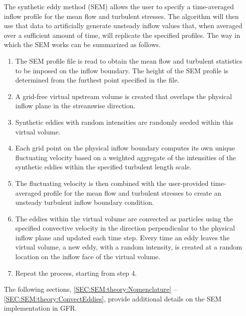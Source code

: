 The synthetic eddy method (SEM)\cite{Jarrin_2006} allows the user to specify a
time-averaged inflow profile for the mean flow and turbulent stresses.
%
The algorithm will then use that data to artificially generate unsteady inflow
values that, when averaged over a sufficient amount of time, will replicate
the specified profiles.
%
The way in which the SEM works can be summarized as follows.
%
\begin{enumerate}
\item
The SEM profile file is read to obtain the mean flow and turbulent statistics
to be imposed on the inflow boundary.
%
The height of the SEM profile is determined from the furthest point
specified in the file.
%
\item
A grid-free virtual upstream volume is created that overlaps the
physical inflow plane in the streamwise direction.
%
\item
Synthetic eddies with random intensities are randomly seeded within
this virtual volume.
%
\item
Each grid point on the physical inflow boundary computes its own unique
fluctuating velocity based on a weighted aggregate of the intensities
of the synthetic eddies within the specified turbulent length scale.
%
\item
The fluctuating velocity is then combined with the user-provided
time-averaged profile for the mean flow and turbulent stresses to
create an unsteady turbulent inflow boundary condition.
%
\item
The eddies within the virtual volume are convected as particles
using the specified convective velocity in the direction perpendicular to the
physical inflow plane and updated each time step.
%
Every time an eddy leaves the virtual volume, a new eddy,
with a random intensity, is created at a random location on the inflow face
of the virtual volume.
%
\item
Repeat the process, starting from step 4.
\end{enumerate}


The following sections, \ref{SEC:SEM:theory:Nomenclature} --
\ref{SEC:SEM:theory:ConvectEddies}, provide additional details on
the SEM implementation in GFR.


\label{SEC:SEM:theory:Nomenclature}

